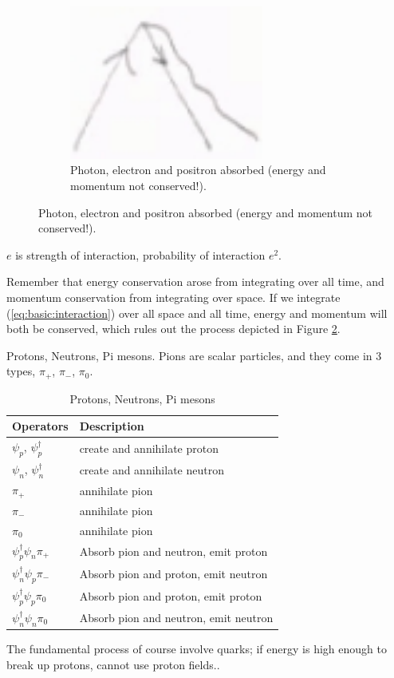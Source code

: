\documentclass[]{article}
\begin{document}
\begin{figure}[H]
\begin{subfigure}{0.48\textwidth}
	\end{subfigure}
	\begin{subfigure}{0.48\textwidth}
		\caption{Photon, electron and positron absorbed (energy and momentum not conserved!).}\label{fig:em:dirac5}
		\includegraphics[width=0.7\textwidth]{em-dirac5}
	\end{subfigure}
\end{figure}

$e$ is strength of interaction, probability of interaction $e^2$.

Remember that energy conservation arose from integrating over all time, and momentum conservation from integrating over space. If we integrate (\ref{eq:basic:interaction}) over all space and all time,  energy and momentum will both be conserved, which rules out the process depicted in Figure \ref{fig:em:dirac5}.

Protons, Neutrons, Pi mesons. Pions are scalar particles, and they come in 3 types, $\pi_+$, $\pi_-$, $\pi_0$.

\begin{table}[H]
	\begin{center}
		\caption{Protons, Neutrons, Pi mesons}
		\begin{tabular}{|l|l|} \hline
			Operators &Description\\ \hline
			$\psi_p$, $\psi^\dagger_p$& create and annihilate proton\\ \hline
		    $\psi_n$, $\psi^\dagger_n$& create and annihilate neutron\\ \hline
			$\pi_+$& annihilate pion\\ \hline
			$\pi_-$&annihilate pion\\ \hline
			$\pi_0$&annihilate pion\\ \hline
			$\psi^\dagger_p \psi_n \pi_+$&Absorb pion and neutron, emit proton\\ \hline
			$\psi^\dagger_n \psi_p \pi_-$&Absorb pion and proton, emit neutron\\ \hline
			$\psi^\dagger_p \psi_p \pi_0$&Absorb pion and proton, emit proton\\ \hline
			$\psi^\dagger_n \psi_n \pi_0$&Absorb pion and neutron, emit neutron \\ \hline
		\end{tabular}
	\end{center}
\end{table}
The fundamental process of course involve quarks; if energy is high enough to break up protons, cannot use proton fields..
\end{document}
